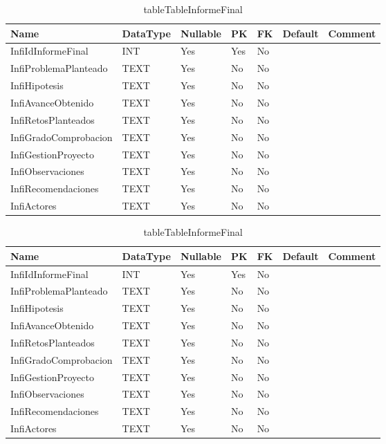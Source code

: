 \begin{table}
	\caption{tableTableInformeFinal}
	\label{labelTableInformeFinal}
	\begin{tabular}{ |l|l|l|l|l|l|l| }
		\hline
		Name & DataType & Nullable & PK & FK & Default & Comment \\ \hline
		InfiIdInformeFinal & INT & Yes & Yes & No &  & \\ \hline 
		InfiProblemaPlanteado & TEXT & Yes & No & No &  & \\ \hline 
		InfiHipotesis & TEXT & Yes & No & No &  & \\ \hline 
		InfiAvanceObtenido & TEXT & Yes & No & No &  & \\ \hline 
		InfiRetosPlanteados & TEXT & Yes & No & No &  & \\ \hline 
		InfiGradoComprobacion & TEXT & Yes & No & No &  & \\ \hline 
		InfiGestionProyecto & TEXT & Yes & No & No &  & \\ \hline 
		InfiObservaciones & TEXT & Yes & No & No &  & \\ \hline 
		InfiRecomendaciones & TEXT & Yes & No & No &  & \\ \hline 
		InfiActores & TEXT & Yes & No & No &  & \\ \hline 
		
	\end{tabular}
\end{table}


\begin{table}
	\caption{tableTableInformeFinal}
	\label{labelTableInformeFinal}
	\begin{tabular}{ |l|l|l|l|l|l|l| }
		\hline
		Name & DataType & Nullable & PK & FK & Default & Comment \\ \hline
		InfiIdInformeFinal & INT & Yes & Yes & No &  & \\ \hline 
		InfiProblemaPlanteado & TEXT & Yes & No & No &  & \\ \hline 
		InfiHipotesis & TEXT & Yes & No & No &  & \\ \hline 
		InfiAvanceObtenido & TEXT & Yes & No & No &  & \\ \hline 
		InfiRetosPlanteados & TEXT & Yes & No & No &  & \\ \hline 
		InfiGradoComprobacion & TEXT & Yes & No & No &  & \\ \hline 
		InfiGestionProyecto & TEXT & Yes & No & No &  & \\ \hline 
		InfiObservaciones & TEXT & Yes & No & No &  & \\ \hline 
		InfiRecomendaciones & TEXT & Yes & No & No &  & \\ \hline 
		InfiActores & TEXT & Yes & No & No &  & \\ \hline 
		
	\end{tabular}
\end{table}


